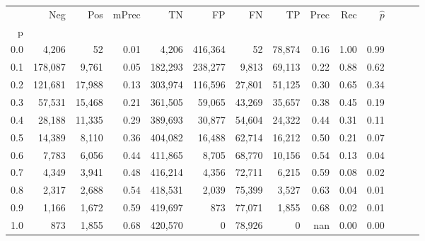 \begin{tabular}{rrrrrrrrrrrrrr}
\toprule
{} &      Neg &     Pos & mPrec &       TN &       FP &      FN &      TP &  Prec &   Rec & $\hat{p}$ \\
p   &          &         &       &          &          &         &         &       &       &           \\
\midrule
0.0 &    4,206 &      52 &  0.01 &    4,206 &  416,364 &      52 &  78,874 &  0.16 &  1.00 &      0.99 \\
0.1 &  178,087 &   9,761 &  0.05 &  182,293 &  238,277 &   9,813 &  69,113 &  0.22 &  0.88 &      0.62 \\
0.2 &  121,681 &  17,988 &  0.13 &  303,974 &  116,596 &  27,801 &  51,125 &  0.30 &  0.65 &      0.34 \\
0.3 &   57,531 &  15,468 &  0.21 &  361,505 &   59,065 &  43,269 &  35,657 &  0.38 &  0.45 &      0.19 \\
0.4 &   28,188 &  11,335 &  0.29 &  389,693 &   30,877 &  54,604 &  24,322 &  0.44 &  0.31 &      0.11 \\
0.5 &   14,389 &   8,110 &  0.36 &  404,082 &   16,488 &  62,714 &  16,212 &  0.50 &  0.21 &      0.07 \\
0.6 &    7,783 &   6,056 &  0.44 &  411,865 &    8,705 &  68,770 &  10,156 &  0.54 &  0.13 &      0.04 \\
0.7 &    4,349 &   3,941 &  0.48 &  416,214 &    4,356 &  72,711 &   6,215 &  0.59 &  0.08 &      0.02 \\
0.8 &    2,317 &   2,688 &  0.54 &  418,531 &    2,039 &  75,399 &   3,527 &  0.63 &  0.04 &      0.01 \\
0.9 &    1,166 &   1,672 &  0.59 &  419,697 &      873 &  77,071 &   1,855 &  0.68 &  0.02 &      0.01 \\
1.0 &      873 &   1,855 &  0.68 &  420,570 &        0 &  78,926 &       0 &   nan &  0.00 &      0.00 \\
\bottomrule
\end{tabular}
